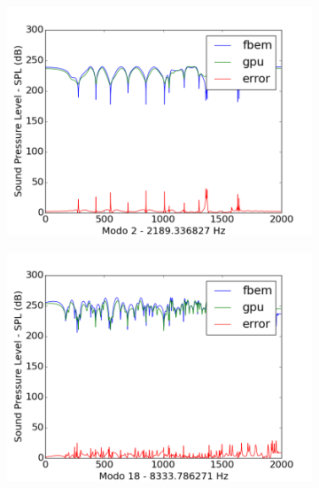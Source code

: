 \begin{figure}[ht]
\begin{subfigure}{0.5\textwidth}
	\includegraphics[width=\textwidth]{../data/transfer_test/ceramic_plate/plots/ceramic_plate-tfv-0_2.png}
	\label{fig:coef_plate_2}
\end{subfigure}
\begin{subfigure}{0.5\textwidth}
	\centering
	\includegraphics[width=\textwidth]{../data/transfer_test/ceramic_plate/plots/ceramic_plate-tfv-0_18.png}
	\label{fig:coef_plate_18}
\end{subfigure}%
\begin{subfigure}{0.5\textwidth}
	\centering

\end{subfigure}
\end{figure}
